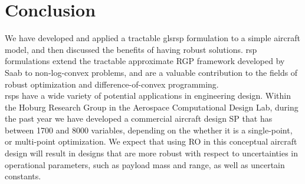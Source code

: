 \section{Conclusion}

We have developed and applied a tractable gls{rsp} formulation to a simple aircraft model,
and then discussed the benefits of having robust solutions. \gls{rsp} formulations extend
the tractable approximate RGP framework developed by Saab to non-log-convex problems,
and are a valuable contribution to the fields of robust optimization and difference-of-convex programming.\\

\gls{rsp}s have a wide variety of potential applications in engineering design.
Within the Hoburg Research Group in the Aerospace Computational Design Lab, during the past year we
have developed a commercial aircraft design SP that has between 1700 and 8000 variables,
depending on the whether it is a single-point, or multi-point optimization.
We expect that using RO in this conceptual aircraft design will result in designs that are more robust with respect to uncertainties in operational parameters, such as payload mass and range, as well as uncertain constants.
